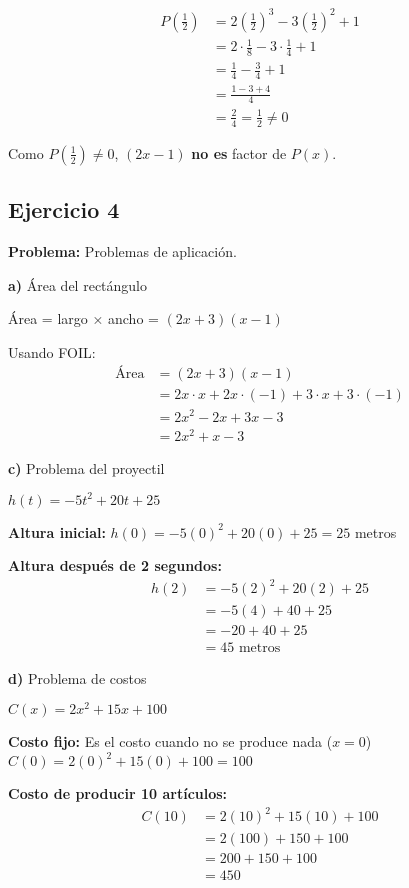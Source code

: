\begin{align}
P\left(\frac{1}{2}\right) &= 2\left(\frac{1}{2}\right)^3 - 3\left(\frac{1}{2}\right)^2 + 1\\
&= 2 \cdot \frac{1}{8} - 3 \cdot \frac{1}{4} + 1\\
&= \frac{1}{4} - \frac{3}{4} + 1\\
&= \frac{1 - 3 + 4}{4}\\
&= \frac{2}{4} = \frac{1}{2} \neq 0
\end{align}

Como $P(\frac{1}{2}) \neq 0$, $(2x - 1)$ \textbf{no es} factor de $P(x)$.

\subsection*{Ejercicio 4}

\textbf{Problema:} Problemas de aplicación.

\textbf{a)} Área del rectángulo

Área = largo × ancho = $(2x + 3)(x - 1)$

Usando FOIL:
\begin{align}
\text{Área} &= (2x + 3)(x - 1)\\
&= 2x \cdot x + 2x \cdot (-1) + 3 \cdot x + 3 \cdot (-1)\\
&= 2x^2 - 2x + 3x - 3\\
&= 2x^2 + x - 3
\end{align}

\textbf{c)} Problema del proyectil

$h(t) = -5t^2 + 20t + 25$

\textbf{Altura inicial:} $h(0) = -5(0)^2 + 20(0) + 25 = 25$ metros

\textbf{Altura después de 2 segundos:}
\begin{align}
h(2) &= -5(2)^2 + 20(2) + 25\\
&= -5(4) + 40 + 25\\
&= -20 + 40 + 25\\
&= 45 \text{ metros}
\end{align}

\textbf{d)} Problema de costos

$C(x) = 2x^2 + 15x + 100$

\textbf{Costo fijo:} Es el costo cuando no se produce nada ($x = 0$)
$C(0) = 2(0)^2 + 15(0) + 100 = 100$

\textbf{Costo de producir 10 artículos:}
\begin{align}
C(10) &= 2(10)^2 + 15(10) + 100\\
&= 2(100) + 150 + 100\\
&= 200 + 150 + 100\\
&= 450
\end{align}